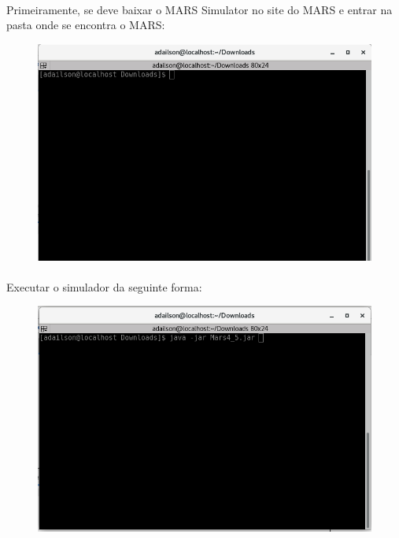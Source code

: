 \documentclass[a4paper, 12pt]{article}
\begin{document}
		\paragraph{}    Primeiramente, se deve baixar o MARS Simulator no site do MARS e entrar na pasta onde se encontra o MARS: 
		\begin{figure}[H]
			\centering
			\includegraphics[scale=0.5]{img1.png}
		\end{figure}
		\paragraph{}    Executar o simulador da seguinte forma:
		\begin{figure}[H]
			\centering
			\includegraphics[scale=0.5]{img2.png}
		\end{figure}
\end{document}
